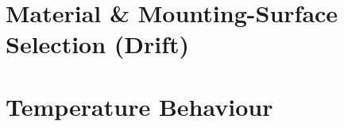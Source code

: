 \section{Material \& Mounting-Surface Selection (Drift)}\label{Material & Mounting-Surface Selection (Drift)}


\section{Temperature Behaviour}\label{Temperature Behaviour}


